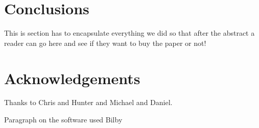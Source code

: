\documentclass[aps,superscriptaddress,twocolumn,nopreprintnumbers,floatfix,groupedaddress]{revtex4-1}
\newcommand{\bilby}{{\sc Bilby}\xspace}
\begin{document}
\section{Conclusions}\label{conc}

This is section has to encapsulate everything we did so that after the abstract a reader can go here and see if they want to buy the paper or not!

\section{Acknowledgements}

Thanks to Chris and Hunter and Michael and Daniel.

Paragraph on the software used \bilby\cite{bilby} 

\end{document}
